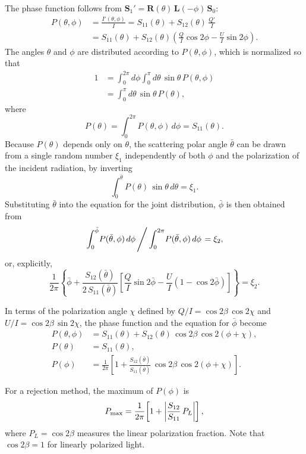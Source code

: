 \documentclass[english,a4paper]{my_memo}
\begin{document}
The phase function follows from
$\mathbf{S}_{1}'=\mathbf{R}(\theta)\,\mathbf{L}(-\phi)\,\mathbf{S}_{0}$:
\begin{align*}
P(\theta,\phi) & = \frac{I'(\theta,\phi)}{I} = S_{11}(\theta) + S_{12}(\theta)\,\frac{Q'}{I}\\
& = S_{11}(\theta) + S_{12}(\theta)\!\left(\frac{Q}{I}\cos2\phi - \frac{U}{I}\sin2\phi\right).
\end{align*}
The angles $\theta$ and $\phi$ are distributed according to
$P(\theta,\phi)$, which is normalized so that
\begin{align*}
1 & = \int_{0}^{2\pi}\!\!d\phi\int_{0}^{\pi}\!d\theta\,\sin\theta\,P(\theta,\phi)\\
& = \int_{0}^{\pi}\!d\theta\,\sin\theta\,P(\theta),
\end{align*}
where
\[
P(\theta) = \int_{0}^{2\pi}\!P(\theta,\phi)\,d\phi = S_{11}(\theta).
\]
Because $P(\theta)$ depends only on $\theta$, the scattering polar
angle $\bar\theta$ can be drawn from a single random number
$\xi_{1}$ independently of both $\phi$ and the polarization of the
incident radiation, by inverting
\[
\int_{0}^{\bar{\theta}}\!P(\theta)\,\sin\theta\,d\theta = \xi_{1}.
\]
Substituting $\bar\theta$ into the equation for the joint
distribution, $\bar\phi$ is then obtained from
\[
\left.\int_{0}^{\bar{\phi}}\!P(\bar{\theta},\phi)\,d\phi\,\middle/\,\int_{0}^{2\pi}\!P(\bar{\theta},\phi)\,d\phi\right. = \xi_{2},
\]
or, explicitly,
\[
\frac{1}{2\pi}\!\left\{\bar{\phi} + \frac{S_{12}(\bar{\theta})}{2\,S_{11}(\bar{\theta})}\!\left[\frac{Q}{I}\sin2\bar{\phi} - \frac{U}{I}\!\left(1-\cos2\bar{\phi}\right)\right]\right\} = \xi_{2}.
\]

In terms of the polarization angle $\chi$ defined by
$Q/I = \cos2\beta\,\cos2\chi$ and $U/I = \cos2\beta\,\sin2\chi$,
the phase function and the equation for $\bar\phi$ become
\begin{align*}
P(\theta,\phi) & = S_{11}(\theta) + S_{12}(\theta)\,\cos2\beta\,\cos2(\phi+\chi),\\
P(\theta) & = S_{11}(\theta),\\
P(\phi) & = \frac{1}{2\pi}\!\left[1 + \frac{S_{12}(\bar{\theta})}{S_{11}(\bar{\theta})}\,\cos2\beta\,\cos2(\phi+\chi)\right].
\end{align*}

For a rejection method, the maximum of $P(\phi)$ is
\[
P_{\rm max} = \frac{1}{2\pi}\!\left[1 + \left|\frac{S_{12}}{S_{11}}\,P_{L}\right|\right],
\]
where $P_{L} = \cos2\beta$ measures the linear polarization
fraction. Note that $\cos2\beta = 1$ for linearly polarized light.
\end{document}
